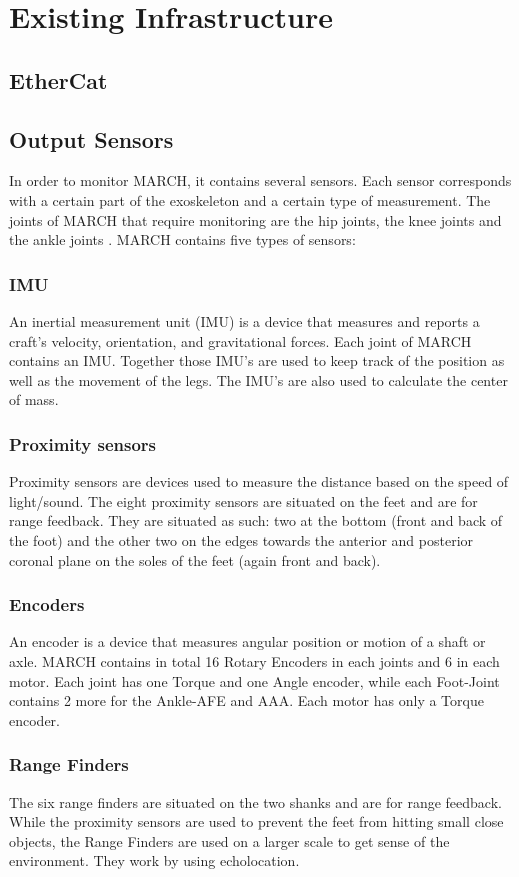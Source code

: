 \section{Existing Infrastructure}\label{sec:infra}
\subsection{EtherCat}
\label{sec:etherCat}

\subsection{Output Sensors}
In order to monitor MARCH, it contains several sensors. Each sensor corresponds with a certain part of the exoskeleton and a certain type of measurement. The joints of MARCH that require monitoring are the hip joints, the knee joints and the ankle joints . MARCH contains five types of sensors:
\subsubsection{IMU}
An inertial measurement unit (IMU) is a device that measures and reports a craft's velocity, orientation, and gravitational forces. Each joint of MARCH contains an IMU. Together those IMU's are used to keep track of the position as well as the movement of the legs. The IMU's are also used to calculate the center of mass. 
\subsubsection{Proximity sensors}
Proximity sensors are devices used to measure the distance based on the speed of light/sound. The eight proximity sensors are situated on the feet and are for range feedback. They are situated as such: two at the bottom (front and back of the foot) and the other two on the edges towards the anterior and posterior coronal plane on the soles of the feet (again front and back). 

\subsubsection{Encoders}
An encoder is a device that measures angular position or motion of a shaft or axle. MARCH contains in total 16 Rotary Encoders in each joints and 6 in each motor. Each joint has one Torque and one Angle encoder, while each Foot-Joint contains 2 more for the Ankle-AFE and AAA. Each motor has only a Torque encoder.
\subsubsection{Range Finders}
The six range finders are situated on the two shanks and are for range feedback. While the proximity sensors are used to prevent the feet from hitting small close objects, the Range Finders are used on a larger scale to get sense of the environment. They work by using echolocation.
